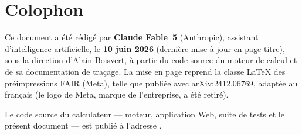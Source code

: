 \section*{Colophon}

Ce document a été rédigé par \textbf{Claude Fable~5} (Anthropic),
assistant d'intelligence artificielle, le \textbf{10 juin 2026} (dernière
mise à jour en page titre), sous la direction d'Alain Boisvert, à partir du
code source du moteur de calcul et de sa documentation de traçage. La mise en page reprend la classe
\LaTeX{} des préimpressions FAIR (Meta), telle que publiée avec
arXiv:2412.06769, adaptée au français (le logo de Meta, marque de
l'entreprise, a été retiré).

Le code source du calculateur --- moteur, application Web, suite de tests
et le présent document --- est publié à l'adresse \ghurl.
